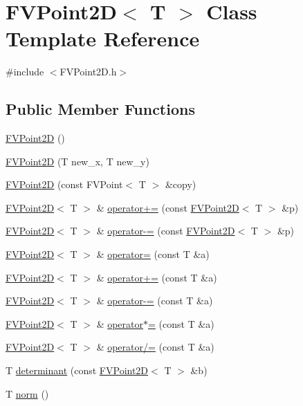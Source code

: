 \hypertarget{classFVL_1_1FVPoint2D}{
\section{FVPoint2D$<$ T $>$ Class Template Reference}
\label{d8/d2b/classFVL_1_1FVPoint2D}
}


{\ttfamily \#include $<$FVPoint2D.h$>$}

\subsection*{Public Member Functions}
\begin{DoxyCompactItemize}
\item 
\hyperlink{classFVL_1_1FVPoint2D_ae7981e40133aa9f3b34864eea7114a1e}{FVPoint2D} ()
\item 
\hyperlink{classFVL_1_1FVPoint2D_a5ae3ba5c698d97efef2bfa6c62fb3c49}{FVPoint2D} (T new\_\-x, T new\_\-y)
\item 
\hyperlink{classFVL_1_1FVPoint2D_a1ad5b3c527e89d469b89ffdfafc6477c}{FVPoint2D} (const FVPoint$<$ T $>$ \&copy)
\item 
\hyperlink{classFVL_1_1FVPoint2D}{FVPoint2D}$<$ T $>$ \& \hyperlink{classFVL_1_1FVPoint2D_af458c950eebca92be86a22acafcda50d}{operator+=} (const \hyperlink{classFVL_1_1FVPoint2D}{FVPoint2D}$<$ T $>$ \&p)
\item 
\hyperlink{classFVL_1_1FVPoint2D}{FVPoint2D}$<$ T $>$ \& \hyperlink{classFVL_1_1FVPoint2D_af10a8c8d4d611dcfb6f842b81329985d}{operator-\/=} (const \hyperlink{classFVL_1_1FVPoint2D}{FVPoint2D}$<$ T $>$ \&p)
\item 
\hyperlink{classFVL_1_1FVPoint2D}{FVPoint2D}$<$ T $>$ \& \hyperlink{classFVL_1_1FVPoint2D_a5948ae8fb36fe09097368c3a1f6e9552}{operator=} (const T \&a)
\item 
\hyperlink{classFVL_1_1FVPoint2D}{FVPoint2D}$<$ T $>$ \& \hyperlink{classFVL_1_1FVPoint2D_a16fff943537377470b4bd79d2deffd5e}{operator+=} (const T \&a)
\item 
\hyperlink{classFVL_1_1FVPoint2D}{FVPoint2D}$<$ T $>$ \& \hyperlink{classFVL_1_1FVPoint2D_af036aa6ae3725f65c4aa7e078ab48836}{operator-\/=} (const T \&a)
\item 
\hyperlink{classFVL_1_1FVPoint2D}{FVPoint2D}$<$ T $>$ \& \hyperlink{classFVL_1_1FVPoint2D_a06b505f300f4d7f0b5c085c12bf1ed2c}{operator$\ast$=} (const T \&a)
\item 
\hyperlink{classFVL_1_1FVPoint2D}{FVPoint2D}$<$ T $>$ \& \hyperlink{classFVL_1_1FVPoint2D_a9c3671200517df046464be3675ef81ee}{operator/=} (const T \&a)
\item 
T \hyperlink{classFVL_1_1FVPoint2D_a08a09a9d48ae528b1039626edc81c8e7}{determinant} (const \hyperlink{classFVL_1_1FVPoint2D}{FVPoint2D}$<$ T $>$ \&b)
\item 
T \hyperlink{classFVL_1_1FVPoint2D_af24be80b084aba7457ceb3151d230575}{norm} ()
\end{DoxyCompactItemize}
